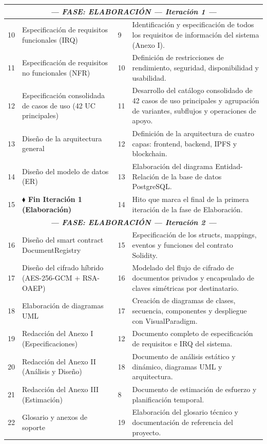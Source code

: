 \documentclass[11pt, a4paper]{article}
\begin{document}
\begin{longtable}{|p{1cm}|p{5.5cm}|p{1.5cm}|p{5.5cm}|}
\hline
\multicolumn{4}{|c|}{\textit{\textbf{--- FASE: ELABORACIÓN --- Iteración 1 ---}}} \\
\hline
10 & Especificación de requisitos funcionales (IRQ) & 9 & Identificación y especificación de todos los requisitos de información del sistema (Anexo I). \\
\hline
11 & Especificación de requisitos no funcionales (NFR) & 10 & Definición de restricciones de rendimiento, seguridad, disponibilidad y usabilidad. \\
\hline
12 & Especificación consolidada de casos de uso (42 UC principales) & 11 & Desarrollo del catálogo consolidado de 42 casos de uso principales y agrupación de variantes, subflujos y operaciones de apoyo. \\
\hline
13 & Diseño de la arquitectura general & 12 & Definición de la arquitectura de cuatro capas: frontend, backend, IPFS y blockchain. \\
\hline
14 & Diseño del modelo de datos (ER) & 13 & Elaboración del diagrama Entidad-Relación de la base de datos PostgreSQL. \\
\hline
15 & \textbf{$\blacklozenge$ Fin Iteración 1 (Elaboración)} & 14 & Hito que marca el final de la primera iteración de la fase de Elaboración. \\
\hline
\multicolumn{4}{|c|}{\textit{\textbf{--- FASE: ELABORACIÓN --- Iteración 2 ---}}} \\
\hline
16 & Diseño del smart contract DocumentRegistry & 15 & Especificación de los structs, mappings, eventos y funciones del contrato Solidity. \\
\hline
17 & Diseño del cifrado híbrido (AES-256-GCM + RSA-OAEP) & 16 & Modelado del flujo de cifrado de documentos privados y encapsulado de claves simétricas por destinatario. \\
\hline
18 & Elaboración de diagramas UML & 17 & Creación de diagramas de clases, secuencia, componentes y despliegue con VisualParadigm. \\
\hline
19 & Redacción del Anexo I (Especificaciones) & 12 & Documento completo de especificación de requisitos e IRQ del sistema. \\
\hline
20 & Redacción del Anexo II (Análisis y Diseño) & 18 & Documento de análisis estático y dinámico, diagramas UML y arquitectura. \\
\hline
21 & Redacción del Anexo III (Estimación) & 8 & Documento de estimación de esfuerzo y planificación temporal. \\
\hline
22 & Glosario y anexos de soporte & 19 & Elaboración del glosario técnico y documentación de referencia del proyecto. \\

\end{longtable}
\end{document}
